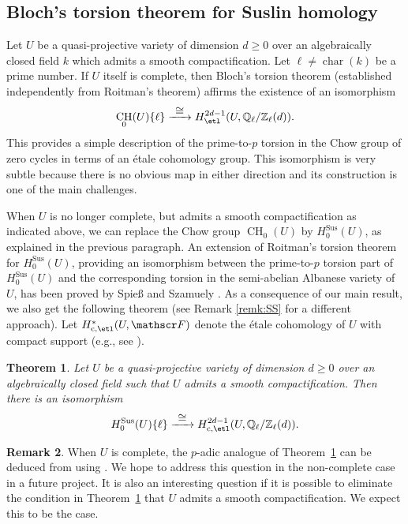 \documentclass[JEP,XML,SOM,Unicode,published]{cedram}
\let\mathcal\mathscr
\def\To#1{\mathchoice{\xrightarrow{\textstyle\kern4pt#1\kern3pt}}{\stackrel{#1}{\longrightarrow}}{}{}}
\newcommand{\rc}{\mathrm{c}}
\newcommand{\sus}{\mathrm{Sus}}
\newtheorem{thm}{Theorem}[section]
\theoremstyle{definition}
\newtheorem{remk}[thm]{Remark}
\newcommand{\thmref}{Theorem~\ref}
\newcommand{\sF}{{\mathcal F}}
\newcommand{\Q}{{\mathbb Q}}
\newcommand{\Z}{{\mathbb Z}}
\DeclareMathOperator{\CH}{CH}
\DeclareMathOperator{\Char}{char}
\begin{document}
\subsection{Bloch's torsion theorem for Suslin homology}
\label{sec:BTor}
Let $U$ be a quasi-projective variety of dimension $d \ge 0$
over an algebraically closed
field $k$ which admits a smooth compactification.
Let $\ell \neq \Char(k)$ be a prime number.
If $U$ itself is complete, then Bloch's torsion theorem \cite{Bloch-torsion}
(established independently from Roitman's theorem)
affirms the existence of an isomorphism
\[ \CH_0(U)\{\ell\} \To{\cong}
H^{2d-1}_{\etl}(U, {\Q_\ell}/{\Z_\ell}(d)).\]
This provides a simple description of the
prime-to-$p$ torsion in the Chow group of zero cycles in terms of an étale
cohomology group.
This isomorphism is very subtle because there is no obvious map
in either direction and its construction is one of the main challenges.

When $U$ is no longer complete, but admits a smooth compactification as indicated above, we can replace the Chow group $\CH_0(U)$ by $H_0^{\sus}(U)$, as explained in the previous paragraph. An extension of Roitman's torsion theorem for $H_0^{\sus}(U)$, providing an isomorphism between the prime-to-$p$ torsion part of $H_0^{\sus}(U)$ and the corresponding torsion in the semi-abelian Albanese variety of $U$, has been proved by
Spie{\ss} and \hbox{Szamuely} \cite{SS}. As a consequence of our main result, we also get the following theorem (see Remark \ref{remk:SS} for a different approach).
Let $H^*_{\rc, \etl}(U, \sF)$ denote the étale cohomology of $U$ with
compact support (e.g., see \cite{Milne}).

\begin{thm}\label{thm:Main-7}
Let $U$ be a quasi-projective variety of dimension $d \ge 0$
over an algebraically closed field such that $U$ admits a smooth compactification.
Then there is an isomorphism
\[
H^{\sus}_0(U)\{\ell\} \To{\cong}
H^{2d-1}_{\rc, \etl}(U, {\Q_\ell}/{\Z_\ell}(d)).
\]
\end{thm}

\begin{remk}\label{remk:p-adic-tor}
When $U$ is complete, the $p$-adic analogue of
\thmref{thm:Main-7} can be deduced from \cite[Cor.\,3.18]{GS} using
\cite[Th.\,8.1]{GL}.
We hope to address this question in the non-complete case in a future project.
It is also an interesting question if it is possible to eliminate
the condition in \thmref{thm:Main-7} that $U$ admits a smooth compactification.
We expect this to be the case.
\end{remk}
\end{document}
